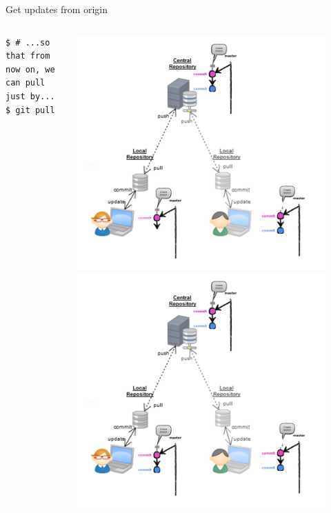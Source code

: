 \begin{frame}[fragile]{Get updates from origin}
\begin{columns}
\begin{column}{0.6\textwidth}
\begin{onlyenv}
\begin{lstlisting}
$ # ...so that from now on, we can pull just by...
$ git pull
	\end{lstlisting}
	\end{onlyenv}
	\end{column}
	\begin{column}{0.4\textwidth}
		\begin{center}
			 {
				\includegraphics[width=0.9\textwidth]{multiuser_they_push.png}
			}\only<3-> {
				\includegraphics[width=0.9\textwidth]{multiuser_pull.png}
			}
		\end{center}
	\end{column}
\end{columns}
\end{frame}

